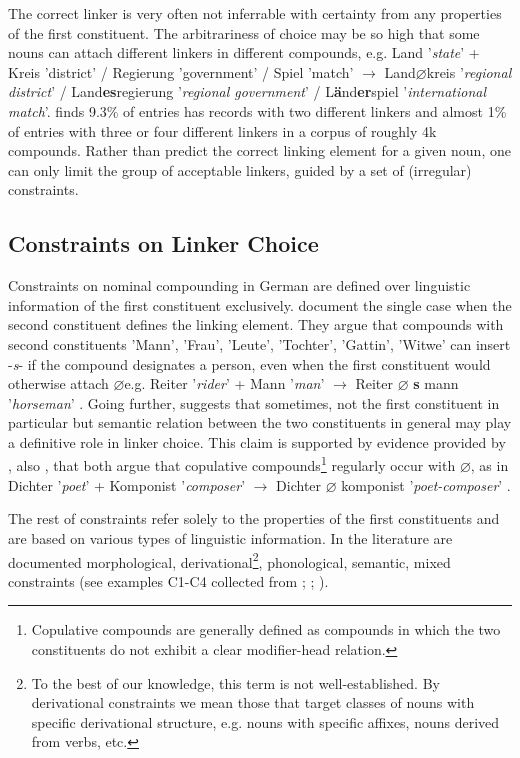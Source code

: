 \documentclass[10pt, a4paper]{article}
\newcommand{\zeroLinker}{\ensuremath{\boldsymbol{\varnothing}}}
\newcommand{\compEx}[7]{%
    #1 '\textit{#2}' + #4 '\textit{#5}'
    $\rightarrow$
    \if\relax\detokenize{#6}\relax
      #1%
    \else
      #6%
    \fi
    \if\relax\detokenize{#3}\relax
      \zeroLinker%
    \else
      \textbf{#3}%
    \fi
    \MakeLowercase{#4} '\textit{#7}'%
}
\begin{document}
The correct linker is very often not inferrable with certainty from any properties of the first constituent. The arbitrariness of choice may be so high that some nouns can attach different linkers in different compounds, e.g. Land '\textit{state}' + Kreis 'district' / Regierung 'government' / Spiel 'match' $\rightarrow$ Land{\zeroLinker}kreis '\textit{regional district}' / Land{\textbf{es}}regierung '\textit{regional government}' / L\textbf{ä}nd{\textbf{er}}spiel '\textit{international match}'. \citet[134]{augst_1975} finds 9.3\% of entries has records with two different linkers and almost 1\% of entries with three or four different linkers in a corpus of roughly 4k compounds. Rather than predict the correct linking element for a given noun, one can only limit the group of acceptable linkers, guided by a set of (irregular) constraints.


\subsection{Constraints on Linker Choice}
\label{sec:constr}

Constraints on nominal compounding in German are defined over linguistic information of the first constituent exclusively. \citet[56]{ortner_mueller-bollhagen_1991} document the single case when the second constituent defines the linking element. They argue that compounds with second constituents 'Mann', 'Frau', 'Leute', 'Tochter', 'Gattin', 'Witwe' can insert -\textit{s}- if the compound designates a person, even when the first constituent would otherwise attach \zeroLinker e.g. \compEx{Reiter}{rider}{s}{Mann}{man}{}{horseman}. Going further, \citet[227]{eisenberg_2013} suggests that sometimes, not the first constituent in particular but semantic relation between the two constituents in general may play a definitive role in linker choice. This claim is supported by evidence provided by \citet{koliopoulou_2014}, also \citet{neef_borgwaldt_2012}, that both argue that copulative compounds\footnote{Copulative compounds are generally defined as compounds in which the two constituents do not exhibit a clear modifier-head relation.} regularly occur with \zeroLinker, as in \compEx{Dichter}{poet}{}{Komponist}{composer}{}{poet-composer}.

The rest of constraints refer solely to the properties of the first constituents and are based on various types of linguistic information. In the literature are documented morphological, derivational\footnote{To the best of our knowledge, this term is not well-established. By derivational constraints we mean those that target classes of nouns with specific derivational structure, e.g. nouns with specific affixes, nouns derived from verbs, etc.}, phonological, semantic, mixed constraints (see examples C1-C4 collected from \citealp[228-230]{eisenberg_2013}; \citealp{libben_etal_2009}; \citealp{nuebling_szczepaniak_2013}).
\end{document}
